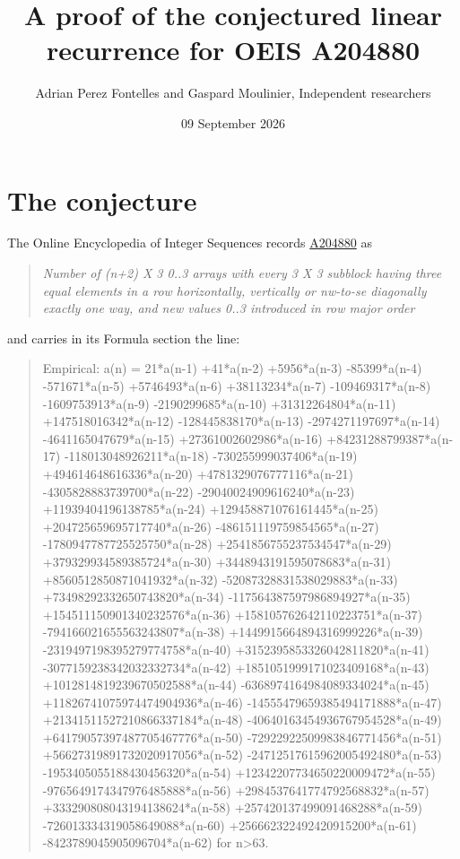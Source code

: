 \documentclass[11pt]{article}
\title{A proof of the conjectured linear recurrence for OEIS A204880}
\author{Adrian Perez Fontelles and Gaspard Moulinier, Independent researchers}
\date{09 September 2026}
\theoremstyle{definition}
\begin{document}
\maketitle
\section{The conjecture}

The Online Encyclopedia of Integer Sequences records \href{https://oeis.org/A204880}{A204880} as

\begin{quote}\itshape Number of (n+2) X 3 0..3 arrays with every 3 X 3 subblock having three equal elements in a row horizontally, vertically or nw-to-se diagonally exactly one way, and new values 0..3 introduced in row major order\end{quote}

and carries in its Formula section the line:

\begin{quote}\ttfamily Empirical: a(n) = 21*a(n-1) +41*a(n-2) +5956*a(n-3) -85399*a(n-4) -571671*a(n-5) +5746493*a(n-6) +38113234*a(n-7) -109469317*a(n-8) -1609753913*a(n-9) -2190299685*a(n-10) +31312264804*a(n-11) +147518016342*a(n-12) -128445838170*a(n-13) -2974271197697*a(n-14) -4641165047679*a(n-15) +27361002602986*a(n-16) +84231288799387*a(n-17) -118013048926211*a(n-18) -730255999037406*a(n-19) +494614648616336*a(n-20) +4781329076777116*a(n-21) -4305828883739700*a(n-22) -29040024909616240*a(n-23) +11939404196138785*a(n-24) +129458871076161445*a(n-25) +204725659695717740*a(n-26) -486151119759854565*a(n-27) -1780947787725525750*a(n-28) +2541856755237534547*a(n-29) +379329934589385724*a(n-30) +3448943191595078683*a(n-31) +8560512850871041932*a(n-32) -52087328831538029883*a(n-33) +73498292332650743820*a(n-34) -117564387597986894927*a(n-35) +154511150901340232576*a(n-36) +158105762642110223751*a(n-37) -794166021655563243807*a(n-38) +1449915664894316999226*a(n-39) -2319497198395279774758*a(n-40) +3152395853326042811820*a(n-41) -3077159238342032332734*a(n-42) +1851051999171023409168*a(n-43) +1012814819239670502588*a(n-44) -6368974164984089334024*a(n-45) +11826741075974474904936*a(n-46) -14555479659385494171888*a(n-47) +21341511527210866337184*a(n-48) -40640163454936767954528*a(n-49) +64179057397487705467776*a(n-50) -72922922509983846771456*a(n-51) +56627319891732020917056*a(n-52) -24712517615962005492480*a(n-53) -1953405055188430456320*a(n-54) +12342207734650220009472*a(n-55) -9765649174347976485888*a(n-56) +2984537641774792568832*a(n-57) +333290808043194138624*a(n-58) +257420137499091468288*a(n-59) -726013334319058649088*a(n-60) +256662322492420915200*a(n-61) -8423789045905096704*a(n-62) for n>63.\end{quote}
\end{document}
